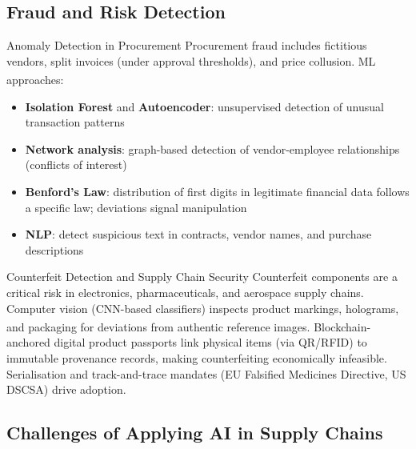 \subsection{Fraud and Risk Detection}


\begin{v3topic}{Anomaly Detection in Procurement}
    Procurement fraud includes fictitious vendors, split invoices (under approval thresholds), and price collusion.
    ML approaches\textsuperscript{\cite[][pp.~8--10]{chopraSupplyChainManagement2019}}:
    \begin{itemize}
        \item \textbf{Isolation Forest} and \textbf{Autoencoder}: unsupervised detection of unusual transaction patterns
        \item \textbf{Network analysis}: graph-based detection of vendor-employee relationships (conflicts of interest)
        \item \textbf{Benford's Law}: distribution of first digits in legitimate financial data follows a specific law; deviations signal manipulation
        \item \textbf{NLP}: detect suspicious text in contracts, vendor names, and purchase descriptions
    \end{itemize}

\end{v3topic}
\begin{v3topic}{Counterfeit Detection and Supply Chain Security}
    Counterfeit components are a critical risk in electronics, pharmaceuticals, and aerospace supply chains.
    Computer vision (CNN-based classifiers) inspects product markings, holograms, and packaging for deviations from authentic reference images\textsuperscript{\cite{laviollaCNNDefectDetection2019}}.
    Blockchain-anchored digital product passports link physical items (via QR/RFID) to immutable provenance records, making counterfeiting economically infeasible.
    Serialisation and track-and-trace mandates (EU Falsified Medicines Directive, US DSCSA) drive adoption.

\end{v3topic}

\subsection{Challenges of Applying AI in Supply Chains}


